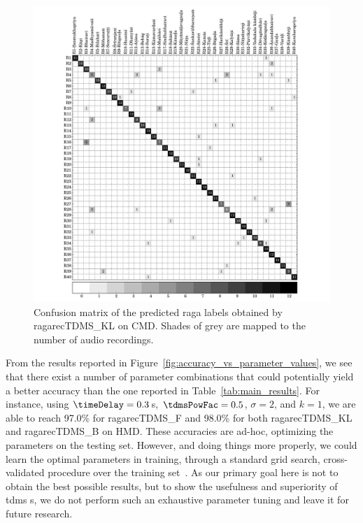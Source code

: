 \begin{figure}
	\begin{center}
		\includegraphics[width=\figSizeHundred]{ch07_ragaRecognition/figures/carnaticPhaseSapce_config_1078.pdf}
	\end{center}\vspace{-1em}
	\caption{Confusion matrix of the predicted \gls{raga} labels obtained by \acrshort{ragarecTDMS_KL} on CMD. Shades of grey are mapped to the number of audio recordings.} 
	\label{fig:confusion_mtx_carnatic}\vspace{-1em}
\end{figure}

From the results reported in Figure~\ref{fig:accuracy_vs_parameter_values}, we see that there exist a number of parameter combinations that could potentially yield a better accuracy than the one reported in Table~\ref{tab:main_results}. For instance, using  $\timeDelay=0.3$\,s, $\tdmsPowFac=0.5$, $\sigma=2$, and $k=1$, we are able to reach 97.0\% for \acrshort{ragarecTDMS_F} and 98.0\% for both \acrshort{ragarecTDMS_KL} and \acrshort{ragarecTDMS_B} on HMD. These accuracies are ad-hoc, optimizing the parameters on the testing set. However, and doing things more properly, we could learn the optimal parameters in training, through a standard grid search, cross-validated procedure over the training set~\cite{Mitchell97BOOK}. As our primary goal here is not to obtain the best possible results, but to show the usefulness and superiority of \gls{tdms} s, we do not perform such an exhaustive parameter tuning and leave it for future research.

